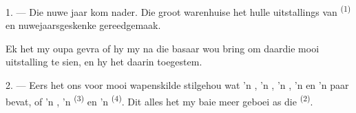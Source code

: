 %
%
%
%

\VUsaut{4.0mm}
\VUsaut{2.0mm}
\VUsaut{3.4mm}

1. --- Die nuwe jaar kom nader. Die groot warenhuise het hulle uitstallings van
 \textsuperscript{(1)} en nuwejaarsgeskenke gereedgemaak.

Ek het my oupa gevra of hy my na die basaar wou bring om daardie mooi uitstalling te
sien, en hy het daarin toegestem.

2. --- Eers het ons voor mooi wapenskilde stilgehou wat 'n , 'n
, 'n , 'n  en 'n paar
 bevat, of 'n , 'n  \textsuperscript{(3)}
en 'n  \textsuperscript{(4)}. Dit alles het my baie meer geboei as die
 \textsuperscript{(2)}.

\VUsaut{3.0mm}
\VUsaut{2.6mm}

